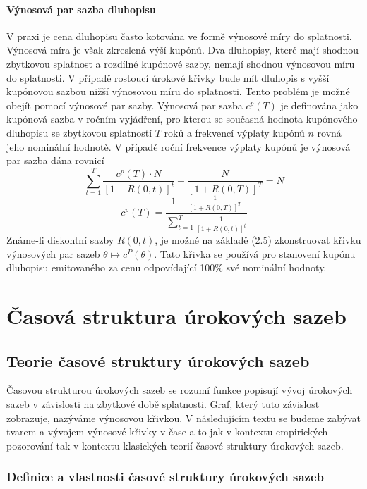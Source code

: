 \documentclass[a4paper]{book}
\begin{document}
\subsection{Výnosová par sazba dluhopisu}

V praxi je cena dluhopisu často kotována ve formě výnosové míry do splatnosti. Výnosová míra je však zkreslená výší kupónů. Dva dluhopisy, které mají shodnou zbytkovou splatnost a rozdílné kupónové sazby, nemají shodnou výnosovou míru do splatnosti. V případě rostoucí úrokové křivky bude mít dluhopis s vyšší kupónovou sazbou nižší výnosovou míru do splatnosti. Tento problém je možné obejít pomocí výnosové par sazby. Výnosová par sazba $c^p(T)$ je definována jako kupónová sazba v ročním vyjádření, pro kterou se současná hodnota kupónového dluhopisu se zbytkovou splatností $T$ roků a frekvencí výplaty kupónů $n$ rovná jeho nominální hodnotě. V případě roční frekvence výplaty kupónů je výnosová par sazba dána rovnicí 
\begin{equation*}
\sum_{t = 1}^{T} \frac{c^p(T) \cdot N}{[1 + R(0,t)]^t} + \frac{N}{[1 + R(0,T)]^T} = N
\end{equation*}  
\begin{equation}
c^p(T) = \frac{1 - \frac{1}{[1 + R(0,T)]^T}}{\sum_{t = 1}^T \frac{1}{[1 + R(0,t)]^t}}
\end{equation}
Známe-li diskontní sazby $R(0,t)$, je možné na základě (2.5) zkonstruovat křivku výnosových par sazeb $\theta \longmapsto c^P(\theta)$. Tato křivka se používá pro stanovení kupónu dluhopisu emitovaného za cenu odpovídající 100\% své nominální hodnoty.

\part{Časová struktura úrokových sazeb}

\chapter{Teorie časové struktury úrokových sazeb}

Časovou strukturou úrokových sazeb se rozumí funkce popisují vývoj úrokových sazeb v závislosti na zbytkové době splatnosti. Graf, který tuto závislost zobrazuje, nazýváme výnosovou křivkou. V následujícím textu se budeme zabývat tvarem a vývojem výnosové křivky v čase a to jak v kontextu empirických pozorování tak v kontextu klasických teorií časové struktury úrokových sazeb.

\section{Definice a vlastnosti časové struktury úrokových sazeb} 
\end{document}
